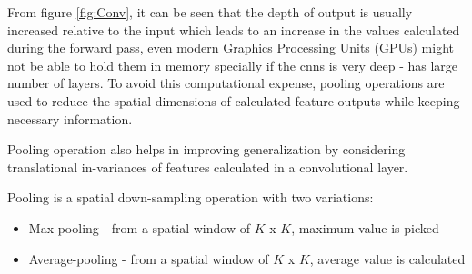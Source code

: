 \label{subsec: pooling_operation}

From figure \ref{fig:Conv}, it can be seen that the depth of output is usually increased relative to the input which leads to an increase in the values calculated during the forward pass, even modern Graphics Processing Units (GPUs) might not be able to hold them in memory specially if the \gls{cnns} is very deep - has large number of layers. To avoid this computational expense, pooling operations are used to reduce the spatial dimensions of calculated feature outputs while keeping necessary information.

Pooling operation also helps in improving generalization by considering translational in-variances of features calculated in a convolutional layer.

Pooling is a spatial down-sampling operation with two variations:

\begin{itemize}
    \item Max-pooling  - from a spatial window of $K$ x $K$, maximum value is picked
    \item Average-pooling - from a spatial window of $K$ x $K$, average value is calculated 
\end{itemize}


